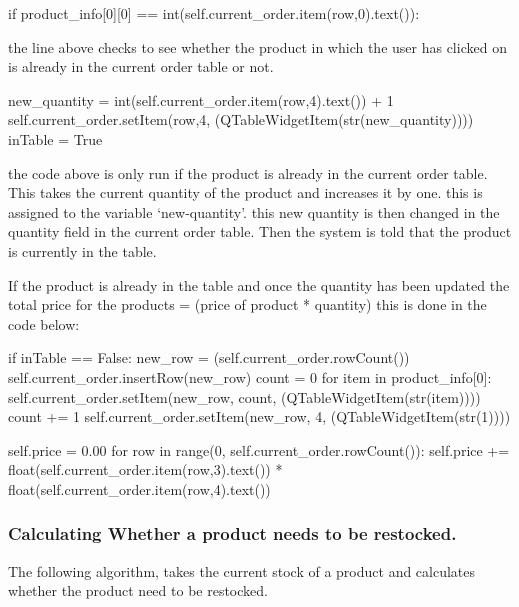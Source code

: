 \begin{python}
if product_info[0][0] == int(self.current_order.item(row,0).text()):
\end{python}

the line above checks to see whether the product in which the user has clicked on is already in the current order table or not.

\begin{python}
new_quantity = int(self.current_order.item(row,4).text()) + 1
self.current_order.setItem(row,4, (QTableWidgetItem(str(new_quantity))))
inTable  = True
\end{python}

the code above is only run if the product is already in the current order table. This takes the current quantity of the product and increases it by one. this is assigned to the variable `new-quantity'. this new quantity is then changed in the quantity field in the current order table. Then the system is told that the product is currently in the table.

If the product is already in the table and once the quantity has been updated the total price for the products = (price of product * quantity) this is done in the code below:

\begin{python}
if inTable == False:
            new_row = (self.current_order.rowCount())
            self.current_order.insertRow(new_row)
            count = 0
            for item in product_info[0]:
                self.current_order.setItem(new_row, count, (QTableWidgetItem(str(item))))
                count += 1
            self.current_order.setItem(new_row, 4, (QTableWidgetItem(str(1))))

        self.price = 0.00
        for row in range(0, self.current_order.rowCount()):
            self.price += float(self.current_order.item(row,3).text()) * float(self.current_order.item(row,4).text())
\end{python}

\pagebreak

\subsubsection{Calculating Whether a product needs to be restocked.}

The following algorithm, takes the current stock of a product and calculates whether the product need to be restocked.


